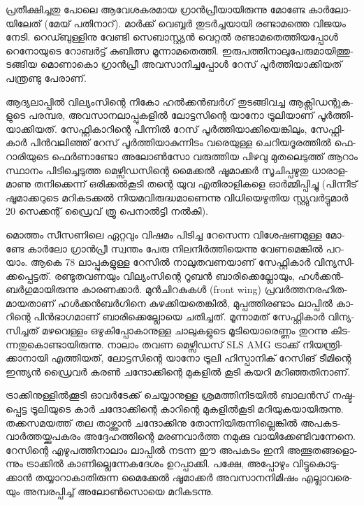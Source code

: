 \vskip 2pt

­പ്ര­തീ­ക്ഷി­ച്ച­തു പോ­ലെ ആവേ­ശ­ക­ര­മായ ഗ്രാന്‍­പ്രീ­യാ­യി­രു­ന്നു മോണ്ടേ കാര്‍­ലോ­യി­ലേ­ത് (മേ­യ് പതി­നാ­റ്). മാര്‍­ക്ക് 
വെ­ബ്ബര്‍ തു­ടര്‍­ച്ച­യാ­യി രണ്ടാ­മ­ത്തെ വി­ജ­യം നേ­ടി. റെ­ഡ്ബു­ള്ളി­നു വേ­ണ്ടി സെ­ബാ­സ്റ്റ്യന്‍ വെ­റ്റല്‍ രണ്ടാ­മ­തെ­ത്തി­യ­പ്പോള്‍ 
റെ­നോ­യു­ടെ റോ­ബര്‍­ട്ട് കു­ബി­ത്സ മൂ­ന്നാ­മ­തെ­ത്തി. ഇരു­പ­ത്തി­നാ­ലു­പേ­രു­മാ­യി­ത്തു­ട­ങ്ങിയ മൊ­ണാ­കൊ ­ഗ്രാന്‍­പ്രീ­ 
അവ­സാ­നി­ച്ച­പ്പോള്‍ ­റേ­സ് പൂര്‍­ത്തി­യാ­ക്കി­യ­ത് പന്ത്ര­ണ്ടു പേ­രാ­ണ്.

ആ­ദ്യ­ലാ­പ്പില്‍ വി­ല്യം­സി­ന്റെ നി­കോ ഹല്‍­ക്കന്‍­ബര്‍­ഗ് തു­ട­ങ്ങി­വ­ച്ച ആക്സി­ഡ­ന്റു­ക­ളു­ടെ പര­മ്പ­ര, അവ­സാ­ന­ലാ­പ്പു­ക­ളില്‍ 
ലോ­ട്ട­സി­ന്റെ യാ­നോ ട്രൂ­ലി­യാ­ണ് പൂര്‍­ത്തി­യാ­ക്കി­യ­ത്. സേ­ഫ്റ്റി­കാ­റി­ന്റെ പി­ന്നില്‍ റേ­സ് പൂര്‍­ത്തി­യാ­ക്കി­യെ­ങ്കി­ലും, 
സേ­ഫ്റ്റി­കാര്‍ പിന്‍­വ­ലി­ഞ്ഞ് റേ­സ് പൂര്‍­ത്തി­യാ­കു­ന്നി­ടം വരെ­യു­ള്ള ചെ­റി­യ­ദൂ­ര­ത്തില്‍ ഫെ­റാ­രി­യു­ടെ ഫെര്‍­ണാ­ണ്ടോ 
അലോണ്‍­സോ വരു­ത്തിയ പി­ഴ­വു മു­ത­ലെ­ടു­ത്ത് ആറാം സ്ഥാ­നം പി­ടി­ച്ചെ­ടു­ത്ത മെ­ഴ്സി­ഡ­സി­ന്റെ മൈ­ക്കല്‍ ഷൂ­മാ­ക്കര്‍ 
സൂ­ചി­പ്പ­ഴു­തു ധാ­രാ­ള­മാ­ണു തനി­ക്കെ­ന്ന് ഒരി­ക്കല്‍­കൂ­ടി തന്റെ യുവ എതി­രാ­ളി­ക­ളെ ഓര്‍­മ്മി­പ്പി­ച്ചു (പി­ന്നീ­ട് ഷൂ­മാ­ക്ക­റു­ടെ 
മറി­ക­ട­ക്കല്‍ നി­യ­മ­വി­രു­ദ്ധ­മാ­ണെ­ന്നു വി­ധി­യെ­ഴു­തിയ സ്റ്റ്യു­വര്‍­ട്ടു­മാര്‍ 20 സെ­ക്ക­ന്റ് ഡ്രൈ­വ് ത്രൂ പെ­നാല്‍­ട്ടി നല്‍­കി­).

­മൊ­ത്തം സീ­സ­ണി­ലെ ഏറ്റ­വും വി­ഷ­മം പി­ടി­ച്ച റേ­സെ­ന്ന വി­ശേ­ഷ­ണ­മു­ള്ള ­മോ­ണ്ടേ കാര്‍­ലോ­ ഗ്രാന്‍­പ്രീ സ്വ­ന്തം പേ­രു 
നി­ല­നിര്‍­ത്തി­യെ­ന്നു വേ­ണ­മെ­ങ്കില്‍ പറ­യാം. ആകെ 78 ലാ­പ്പു­ക­ളു­ള്ള റേ­സില്‍ നാ­ലു­ത­വ­ണ­യാ­ണ് സേ­ഫ്റ്റി­കാര്‍ 
വി­ന്യ­സി­ക്ക­പ്പെ­ട്ട­ത്. രണ്ടു­ത­വ­ണ­യും വി­ല്യം­സി­ന്റെ റൂ­ബന്‍ ബാ­രി­ക്കെ­ല്ലോ­യും, ഹള്‍­ക്കന്‍­ബര്‍­ഗു­മാ­യി­രു­ന്നു കാ­ര­ണ­ക്കാര്‍. 
മുന്‍­ചി­റ­കു­കള്‍ (front wing) പ്ര­വര്‍­ത്ത­ന­ര­ഹി­ത­മാ­യ­താ­ണ് ഹള്‍­ക്കന്‍­ബര്‍­ഗി­നെ കു­ഴ­ക്കി­യ­തെ­ങ്കില്‍, മു­പ്പ­ത്തി­ര­ണ്ടാം 
­ലാ­പ്പില്‍ കാ­റി­ന്റെ പിന്‍­ഭാ­ഗ­മാ­ണ് ബാ­രി­ക്കെ­ല്ലോ­യെ ചതി­ച്ച­ത്. മൂ­ന്നാ­മ­ത് സേ­ഫ്റ്റി­കാര്‍ വി­ന്യ­സി­ച്ച­ത് മഴ­വെ­ള്ളം 
ഒഴു­കി­പ്പോ­കാ­നു­ള്ള ചാ­ലു­ക­ളു­ടെ മൂ­ടി­യൊ­രെ­ണ്ണം തു­റ­ന്നു കി­ട­ന്ന­തു­കൊ­ണ്ടാ­യി­രു­ന്നു. നാ­ലാം തവണ മെ­ഴ്സി­ഡ­സ് 
SLS AMG ട്രാ­ക്ക് നി­യ­ന്ത്രി­ക്കാ­നാ­യി എത്തി­യ­ത്, ലോ­ട്ട­സി­ന്റെ യാ­നോ ട്രൂ­ലി ഹി­സ്പാ­നി­ക് റേ­സി­ങ് ടീ­മി­ന്റെ ഇന്ത്യന്‍ 
ഡ്രൈ­വര്‍ കരണ്‍ ചന്ദോ­ക്കി­ന്റെ മു­ക­ളില്‍ കൂ­ടി കയ­റി മറി­ഞ്ഞ­തി­നാ­ണ്.

­ട്രാ­ക്കി­നു­ള്ളില്‍­ക്കൂ­ടി ഓവര്‍­ടേ­ക്ക് ചെ­യ്യാ­നു­ള്ള ശ്ര­മ­ത്തി­നി­ട­യില്‍ ബാ­ലന്‍­സ് നഷ്ട­പ്പെ­ട്ട ട്രൂ­ലി­യു­ടെ കാര്‍ ചന്ദോ­ക്കി­ന്റെ 
കാ­റി­ന്റെ മു­ക­ളില്‍­കൂ­ടി മറി­യു­ക­യാ­യി­രു­ന്നു. തക്ക­സ­മ­യ­ത്ത് തല താ­ഴ്ത്താന്‍ ചന്ദോ­ക്കി­നു തോ­ന്നി­യി­രു­ന്നി­ല്ലെ­ങ്കില്‍ 
അപ­ക­ട­വാര്‍­ത്ത­യ്ക്കു­പ­ക­രം അദ്ദേ­ഹ­ത്തി­ന്റെ മര­ണ­വാര്‍­ത്ത നമു­ക്കു വാ­യി­ക്കേ­ണ്ടി­വ­ന്നേ­നെ. റേ­സി­ന്റെ എഴു­പ­ത്തി­നാ­ലാം 
ലാ­പ്പില്‍ നട­ന്ന ഈ അപ­ക­ടം ഇനി അത്ഭു­ത­ങ്ങ­ളൊ­ന്നും ട്രാ­ക്കില്‍ കാ­ണി­ല്ലെ­ന്നേ­ക­ദേ­ശം ഉറ­പ്പാ­ക്കി. പക്ഷേ, അപ്പോ­ഴും 
വി­ട്ടു­കൊ­ടു­ക്കാന്‍ തയ്യാ­റാ­കാ­തി­രു­ന്ന മൈ­ക്കേല്‍ ഷൂ­മാ­ക്കര്‍ അവ­സാ­ന­നി­മി­ഷം എല്ലാ­വ­രെ­യും അമ്പ­ര­പ്പി­ച്ച് 
അലോണ്‍­സൊ­യെ മറി­ക­ട­ന്നു­.

